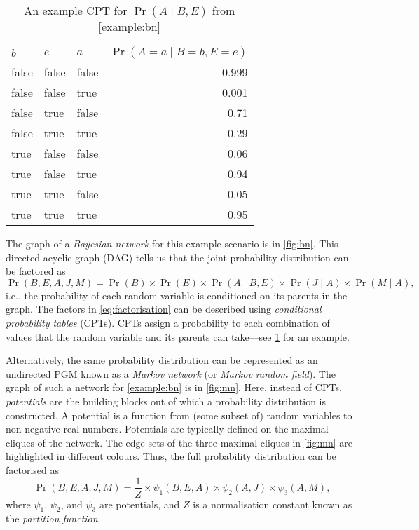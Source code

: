 \begin{table}
  \caption{An example CPT for $\Pr(A \mid B, E)$ from \cref{example:bn}}
  \label{table:examplecpt}
  \centering
  \begin{tabular}[t]{lllr}
    \toprule
    $b$ & $e$ & $a$ & $\Pr(A = a \mid B = b, E = e)$ \\
    \midrule
    false & false & false & 0.999 \\
    false & false & true & 0.001 \\
    false & true & false & 0.71 \\
    false & true & true & 0.29 \\
    true & false & false & 0.06 \\
    true & false & true & 0.94 \\
    true & true & false & 0.05 \\
    true & true & true & 0.95 \\
    \bottomrule
  \end{tabular}
\end{table}

The graph of a \emph{Bayesian network} for this example scenario is in \cref{fig:bn}. This directed acyclic graph (DAG) tells us that the joint probability distribution can be factored as
\begin{equation} \label{eq:factorisation}
  \Pr(B, E, A, J, M) = \Pr(B) \times \Pr(E) \times \Pr(A \mid B, E) \times \Pr(J \mid A) \times \Pr(M \mid A),
\end{equation}
i.e., the probability of each random variable is conditioned on its parents in the graph. The factors in \cref{eq:factorisation} can be described using \emph{conditional probability tables} (CPTs). CPTs assign a probability to each combination of values that the random variable and its parents can take---see \cref{table:examplecpt} for an example.

Alternatively, the same probability distribution can be represented as an undirected PGM known as a \emph{Markov network} (or \emph{Markov random field}). The graph of such a network for \cref{example:bn} is in \cref{fig:mn}. Here, instead of CPTs, \emph{potentials} are the building blocks out of which a probability distribution is constructed. A potential is a function from (some subset of) random variables to non-negative real numbers. Potentials are typically defined on the maximal cliques of the network. The edge sets of the three maximal cliques in \cref{fig:mn} are highlighted in different colours. Thus, the full probability distribution can be factorised as
\[
\Pr(B, E, A, J, M) = \frac{1}{Z} \times \psi_1(B, E, A) \times \psi_2(A, J) \times \psi_3(A, M),
\]
where $\psi_1$, $\psi_2$, and $\psi_3$ are potentials, and $Z$ is a normalisation constant known as the \emph{partition function}.

